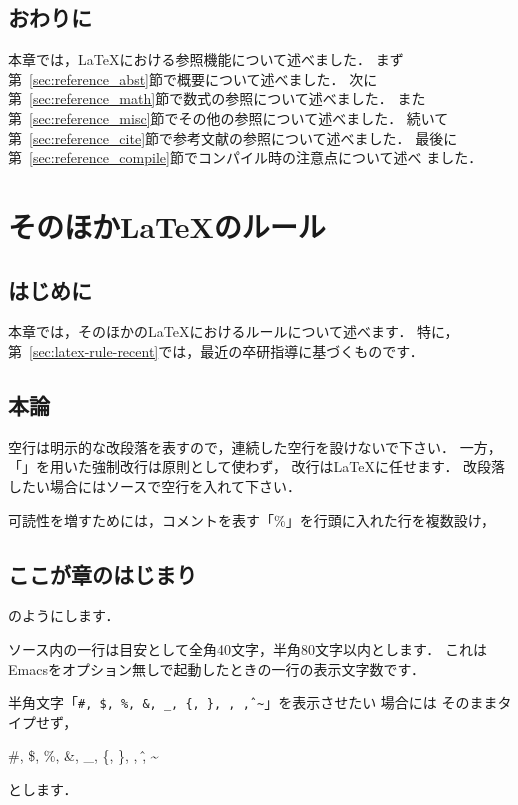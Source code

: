 \documentclass[a4j,12pt,dvipdfmx,oneside]{jsbook}
\theoremstyle{definition}
\begin{document}
\section{おわりに}\label{sec:reference_summary}
本章では，\LaTeX{}における参照機能について述べました．
まず第~\ref{sec:reference_abst}節で概要について述べました．
次に第~\ref{sec:reference_math}節で数式の参照について述べました．
また第~\ref{sec:reference_misc}節でその他の参照について述べました．
続いて第~\ref{sec:reference_cite}節で参考文献の参照について述べました．
最後に第~\ref{sec:reference_compile}節でコンパイル時の注意点について述べ
ました．
%
%
%
\chapter{そのほか\LaTeX{}のルール}\label{chap:latex-rule}
%
%
%
\section{はじめに}\label{sec:latex-rule_intro}
本章では，そのほかの\LaTeX{}におけるルールについて述べます．
特に，第~\ref{sec:latex-rule-recent}では，最近の卒研指導に基づくものです．
%
%
%
\section{本論}
空行は明示的な改段落を表すので，連続した空行を設けないで下さい．
一方，「\texttt{\yen\yen}」を用いた強制改行は原則として使わず，
改行は\LaTeX{}に任せます．
改段落したい場合にはソースで空行を入れて下さい．

可読性を増すためには，コメントを表す「\%」を行頭に入れた行を複数設け，
\begin{center}
\begin{screen}
\begin{verbatimtab}
%
%
%
\chapter{ここが章のはじまり}
%
%
%
\end{verbatimtab}
\end{screen}
\end{center}
のようにします．


ソース内の一行は目安として全角40文字，半角80文字以内とします．
これはEmacsをオプション無しで起動したときの一行の表示文字数です．

半角文字「\texttt{\#, \$, \%, \&, \_, \{, \}, \textyen, \^, \~{}}」を表示させたい
場合には
そのままタイプせず，
\begin{center}
\begin{screen}
\begin{verbatimtab}
\#, \$, \%, \&, \_, \{, \}, \textyen, \^, \~{}
\end{verbatimtab}
\end{screen}
\end{center}
とします．
\end{document}

